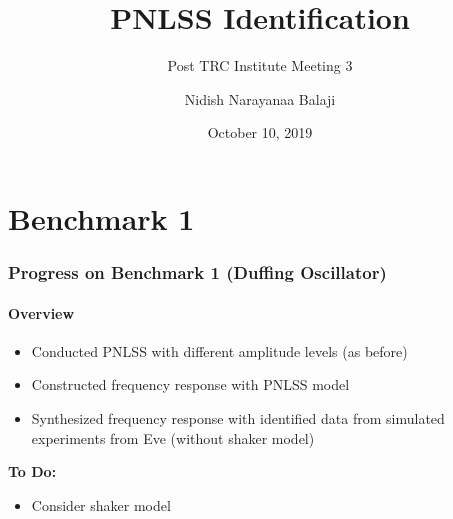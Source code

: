 \documentclass[aspectratio=169]{beamer}
\title{PNLSS Identification}
\subtitle{Post TRC Institute Meeting 3}
\author[Balaji, N. N.]{Nidish Narayanaa Balaji}
\institute[Rice U.]{Rice University, Houston, TX 77005}
\date{October 10, 2019}
\begin{document}
\maketitle{}

\section{Benchmark 1}
\label{sec:benchmark-1}
\begin{frame}  
  \frametitle{Progress on Benchmark 1 (Duffing Oscillator)}
  \framesubtitle{Overview}  
  \begin{itemize}
  \item Conducted PNLSS with different amplitude levels (as before)
  \item Constructed frequency response with PNLSS model
  \item Synthesized frequency response with identified data from
    simulated experiments from Eve (without shaker model)
  \end{itemize}
  \textbf{To Do:}
  \begin{itemize}
  \item Consider shaker model
  \end{itemize}
\end{frame}
\end{document}
